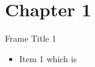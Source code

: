 
\section{Chapter 1}

\begin{frame}{Frame Title 1}
  \begin{itemize}
    \item Item 1 which is 
  \end{itemize}
\end{frame}